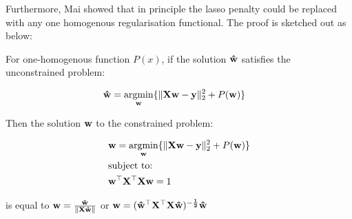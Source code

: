 Furthermore, Mai showed that in principle the lasso penalty could be replaced with any one homogenous regularisation functional. The proof is sketched out as below:

\begin{thm}

    For one-homogenous function $P(x)$, if the solution $\bold{\hat{w}}$ satisfies the unconstrained problem:

    \begin{align}
        & \bold{\hat{w}}=\underset{\bold{w}}{\mathrm{argmin}}\{ \|\bold{Xw-y}\|^2_2 + P(\bold{w}) \}
    \end{align}

    Then the solution $\bold{w}$ to the constrained problem:

    \begin{align}
        & \bold{w}=\underset{\bold{w}}{\mathrm{argmin}}\{ \|\bold{Xw-y}\|^2_2 + P(\bold{w}) \}\\
        & \text{subject to:} \notag\\
        & \bold{w^{\top}X^{\top}Xw}=1 \notag
    \end{align}

    is equal to $\bold{w}=\bold{\frac{\hat{w}}{\|X\hat{w}\|}}$ or $\bold{w}=\bold{(\hat{w}^{\top}X^{\top}X\hat{w})^{-\frac{1}{2}}\hat{w}}$

\end{thm}

